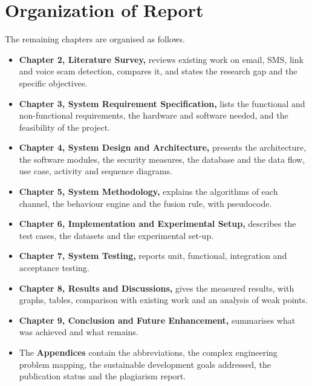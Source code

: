{\section{Organization of Report}
The remaining chapters are organised as follows.
\begin{itemize}
\item \textbf{Chapter 2, Literature Survey,} reviews existing work on email, SMS, link and voice scam detection, compares it, and states the research gap and the specific objectives.
\item \textbf{Chapter 3, System Requirement Specification,} lists the functional and non-functional requirements, the hardware and software needed, and the feasibility of the project.
\item \textbf{Chapter 4, System Design and Architecture,} presents the architecture, the software modules, the security measures, the database and the data flow, use case, activity and sequence diagrams.
\item \textbf{Chapter 5, System Methodology,} explains the algorithms of each channel, the behaviour engine and the fusion rule, with pseudocode.
\item \textbf{Chapter 6, Implementation and Experimental Setup,} describes the test cases, the datasets and the experimental set-up.
\item \textbf{Chapter 7, System Testing,} reports unit, functional, integration and acceptance testing.
\item \textbf{Chapter 8, Results and Discussions,} gives the measured results, with graphs, tables, comparison with existing work and an analysis of weak points.
\item \textbf{Chapter 9, Conclusion and Future Enhancement,} summarises what was achieved and what remains.
\item The \textbf{Appendices} contain the abbreviations, the complex engineering problem mapping, the sustainable development goals addressed, the publication status and the plagiarism report.
\end{itemize}

}
